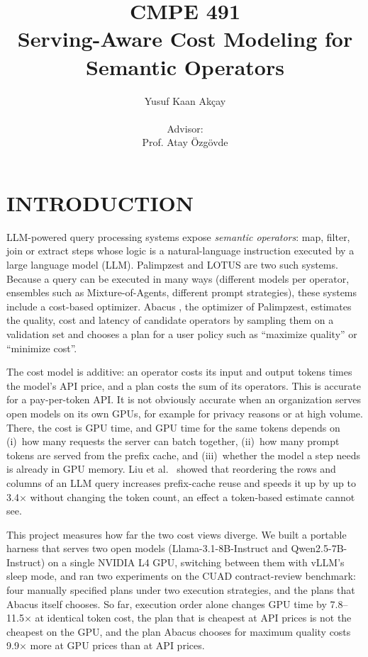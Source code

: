\documentclass[a4paper,12pt]{report}
\begin{document}
\title{CMPE 491 \\ Serving-Aware Cost Modeling for Semantic Operators}
\author{
Yusuf Kaan Akçay \\ \\
Advisor: \\
Prof. Atay Özgövde
}
\date{}
\maketitle{}
\tableofcontents

\chapter{INTRODUCTION}

LLM-powered query processing systems expose \emph{semantic operators}: map, filter, join or
extract steps whose logic is a natural-language instruction executed by a large language model
(LLM). Palimpzest \cite{palimpzest} and LOTUS \cite{lotus} are two such systems. Because a query can
be executed in many ways (different models per operator, ensembles such as Mixture-of-Agents,
different prompt strategies), these systems include a cost-based optimizer. Abacus
\cite{russo2025abacus}, the optimizer of Palimpzest, estimates the quality, cost and latency of
candidate operators by sampling them on a validation set and chooses a plan for a user policy such as
``maximize quality'' or ``minimize cost''.

The cost model is additive: an operator costs its input and output tokens times the model's API
price, and a plan costs the sum of its operators. This is accurate for a pay-per-token API. It is not
obviously accurate when an organization serves open models on its own GPUs, for example for privacy
reasons or at high volume. There, the cost is GPU time, and GPU time for the same tokens depends on
(i)~how many requests the server can batch together, (ii)~how many prompt tokens are served from the
prefix cache, and (iii)~whether the model a step needs is already in GPU memory. Liu et
al.~\cite{liu2025optimizing} showed that reordering the rows and columns of an LLM query increases
prefix-cache reuse and speeds it up by up to 3.4$\times$ without changing the token count, an effect a
token-based estimate cannot see.

This project measures how far the two cost views diverge. We built a portable harness that serves
two open models (Llama-3.1-8B-Instruct and Qwen2.5-7B-Instruct) on a single NVIDIA L4 GPU, switching
between them with vLLM's sleep mode, and ran two experiments on the CUAD contract-review benchmark:
four manually specified plans under two execution strategies, and the plans that Abacus itself
chooses. So far, execution order alone changes GPU time by 7.8--11.5$\times$ at identical token cost,
the plan that is cheapest at API prices is not the cheapest on the GPU, and the plan Abacus chooses
for maximum quality costs 9.9$\times$ more at GPU prices than at API prices.
\end{document}
